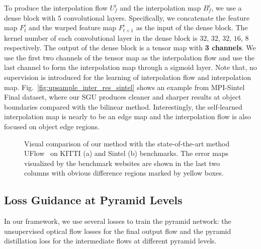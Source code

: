 \documentclass[final]{cvpr}
\begin{document}
To produce the interpolation flow $U_{f}^{i}$ and the interpolation map $B_{f}^{i}$, we use a dense block with $5$ convolutional layers. Specifically, we concatenate the feature map $F_{t}^{i}$ and the warped feature map $F_{t+1}^{i}$ as the input of the dense block. The kernel number of each convolutional layer in the dense block is $32$, $32$, $32$, $16$, $8$ respectively. The output of the dense block is a tensor map with \textbf{3 channels}. We use the first two channels of the tensor map as the interpolation flow and use the last channel to form the interpolation map through a sigmoid layer. 
Note that, no supervision is introduced for the learning of interpolation flow and interpolation map. Fig.~\ref{fig:upsample_inter_res_sintel} shows an example from MPI-Sintel Final dataset, where our SGU produces cleaner and sharper results at object boundaries compared with the bilinear method. Interestingly, the self-learned interpolation map is nearly to be an edge map and the interpolation flow is also focused on object edge regions. \begin{figure*}[ht]
	\centering
	\caption{Visual comparison of our method with the state-of-the-art method UFlow~\cite{jonschkowski2020matters} on KITTI (a) and Sintel (b) benchmarks. The error maps visualized by the benchmark websites are shown in the last two columns with obvious difference regions marked by yellow boxes. }
\label{fig:results_pk_benchmark}
\end{figure*}

\subsection{Loss Guidance at Pyramid Levels}\label{sec:algo_loss_functions}
In our framework, we use several losses to train the pyramid network: the unsupervised optical flow losses for the final output flow and the pyramid distillation loss for the intermediate flows at different pyramid levels.
\end{document}
